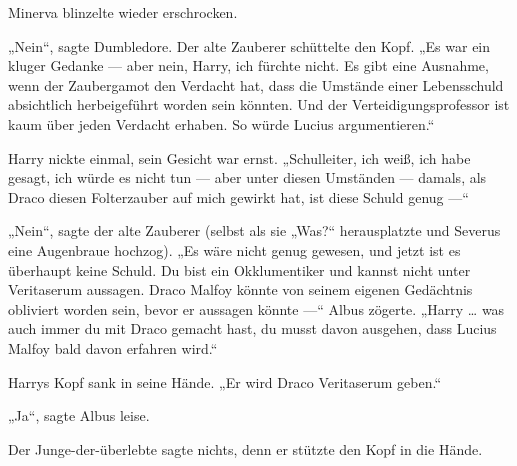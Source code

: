 Minerva blinzelte wieder erschrocken.

„Nein“, sagte Dumbledore. Der alte Zauberer schüttelte den Kopf.
„Es war ein kluger Gedanke — aber nein, Harry, ich fürchte nicht. Es gibt eine Ausnahme, wenn der Zaubergamot den Verdacht hat, dass die Umstände einer Lebensschuld absichtlich herbeigeführt worden sein könnten. Und der Verteidigungsprofessor ist kaum über jeden Verdacht erhaben. So würde Lucius argumentieren.“

Harry nickte einmal, sein Gesicht war ernst.
„Schulleiter, ich weiß, ich habe gesagt, ich würde es nicht tun — aber unter diesen Umständen — damals, als Draco diesen Folterzauber auf mich gewirkt hat, ist diese Schuld genug —“

„Nein“, sagte der alte Zauberer (selbst als sie
„Was?“ herausplatzte und Severus eine Augenbraue hochzog).
„Es wäre nicht genug gewesen, und jetzt ist es überhaupt keine Schuld. Du bist ein Okklumentiker und kannst nicht unter Veritaserum aussagen. Draco Malfoy könnte von seinem eigenen Gedächtnis obliviert worden sein, bevor er aussagen könnte —“ Albus zögerte.
„Harry … was auch immer du mit Draco gemacht hast, du musst davon ausgehen, dass Lucius Malfoy bald davon erfahren wird.“

Harrys Kopf sank in seine Hände.
„Er wird Draco Veritaserum geben.“

„Ja“, sagte Albus leise.

Der Junge-der-überlebte sagte nichts, denn er stützte den Kopf in die Hände.

